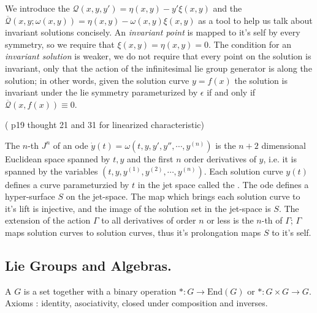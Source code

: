 \documentclass[12pt]{article}
\begin{document}
We introduce the  $\mathcal Q(x,y,y')=\eta(x,y)-y'\xi(x,y)$ and the  $\mathcal{\overline Q}(x,y;\omega(x,y)) = \eta(x,y)-\omega(x,y)\xi(x,y)$ as a tool to help us talk about invariant solutions concisely. An \textit{invariant point} is mapped to it's self by every symmetry, so we require that $\xi(x,y) = \eta(x,y) = 0$. The condition for an \textit{invariant solution} is weaker, we do not require that every point on the solution is invariant, only that the action of the infinitesimal lie group generator is along the solution; in other words, given the solution curve $y=f(x)$ the solution is invariant under the lie symmetry parameturized by $\epsilon$ if and only if $\mathcal{\overline Q}(x,f(x)) \equiv 0$. 


(\cite{Symmetry-methods} p19 thought 21 and 31 for linearized characteristic)

The $n$-th  $J^n$ of an ode $\dot y(t) = \omega(t,y,y',y'',\cdots,y^{(n)})$ is the $n+2$ dimensional Euclidean space spanned by $t,y$ and the first $n$ order derivatives of $y$, i.e. it is spanned by the variables $(t,y,y^{(1)},y^{(2)},\cdots,y^{(n)})$. Each solution curve $y(t)$ defines a curve parameturzied by $t$ in the jet space called the . The ode defines a hyper-surface $S$ on the jet-space. The map which brings each solution curve to it's lift is injective, and the image of the solution set in the jet-space is $S$. The extension of the action $\Gamma$ to all derivatives of order $n$ or less is the $n$-th  of $\Gamma$; $\Gamma$ maps solution curves to solution curves, thus it's prolongation maps $S$ to it's self. 

\subsection{Lie Groups and Algebras.}

A  $G$ is a set together with a binary operation $\ast : G \to \text{End} (G)$ or $\ast : G\times G \to G$. Axioms : identity, asociativity, closed under composition and inverses. 
\end{document}
